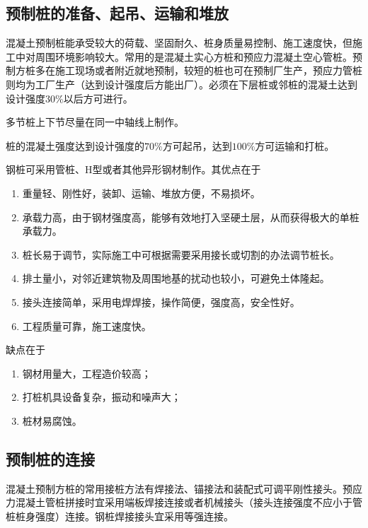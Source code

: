 \documentclass{book}
\begin{document}
\subsection{预制桩的准备、起吊、运输和堆放}
\par 混凝土预制桩能承受较大的荷载、坚固耐久、桩身质量易控制、施工速度快，但施工中对周围环境影响较大。常用的是混凝土实心方桩和预应力混凝土空心管桩。预制方桩多在施工现场或者附近就地预制，较短的桩也可在预制厂生产，预应力管桩则均为工厂生产（达到设计强度后方能出厂）。必须在下层桩或邻桩的混凝土达到设计强度$30\%$以后方可进行。
\par 多节桩上下节尽量在同一中轴线上制作。
\par 桩的混凝土强度达到设计强度的$70\%$方可起吊，达到$100\%$方可运输和打桩。
\par 钢桩可采用管桩、H型或者其他异形钢材制作。其优点在于
\begin{enumerate}
    \item 重量轻、刚性好，装卸、运输、堆放方便，不易损坏。
    \item 承载力高，由于钢材强度高，能够有效地打入坚硬土层，从而获得极大的单桩承载力。
    \item 桩长易于调节，实际施工中可根据需要采用接长或切割的办法调节桩长。
    \item 排土量小，对邻近建筑物及周围地基的扰动也较小，可避免土体隆起。
    \item 接头连接简单，采用电焊焊接，操作简便，强度高，安全性好。
    \item 工程质量可靠，施工速度快。
\end{enumerate}
\par 缺点在于
\begin{enumerate}
    \item 钢材用量大，工程造价较高；
    \item 打桩机具设备复杂，振动和噪声大；
    \item 桩材易腐蚀。
\end{enumerate}
\subsection{预制桩的连接}
\par 混凝土预制方桩的常用接桩方法有焊接法、锚接法和装配式可调平刚性接头。预应力混凝土管桩拼接时宜采用端板焊接连接或者机械接头（接头连接强度不应小于管桩桩身强度）连接。钢桩焊接接头宜采用等强连接。
\end{document}
